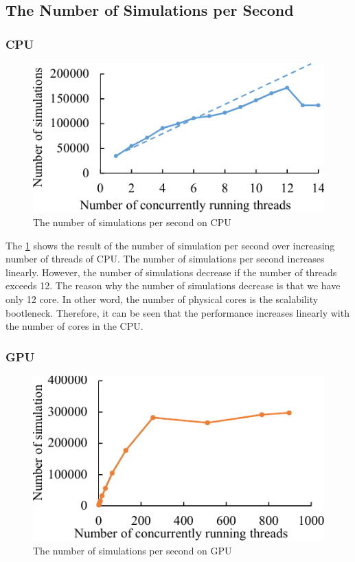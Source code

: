 \subsection{The Number of Simulations per Second}
\subsubsection{CPU}
\begin{figure}
\includegraphics[width=0.95\columnwidth]{figures/cpu_num_simulation.pdf}
\caption{The number of simulations per second on CPU}
\label{fig:cpu_num_simulation}
\end{figure}

The \cref{fig:cpu_num_simulation} shows the result of the number of simulation per second over increasing number of threads of CPU. 
The number of simulations per second increases linearly.
However, the number of simulations decrease if the number of threads exceeds 12. 
The reason why the number of simulations decrease is that we have only 12 core. In other word, the number of physical cores is the scalability bootleneck. 
Therefore, it can be seen that the performance increases linearly with the number of cores in the CPU. 
\subsubsection{GPU}
\begin{figure}
\includegraphics[width=0.95\columnwidth]{figures/gpu_num_simulation.pdf}
\caption{The number of simulations per second on GPU}
\label{fig:gpu_num_simulation}
\end{figure}

